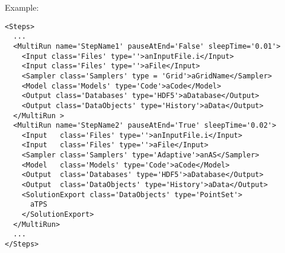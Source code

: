 Example:
\begin{lstlisting}[style=XML,morekeywords={pauseAtEnd,sleepTime,class}]
<Steps>
  ...
  <MultiRun name='StepName1' pauseAtEnd='False' sleepTime='0.01'>
    <Input class='Files' type=''>anInputFile.i</Input>
    <Input class='Files' type=''>aFile</Input>
    <Sampler class='Samplers' type = 'Grid'>aGridName</Sampler>
    <Model class='Models' type='Code'>aCode</Model>
    <Output class='Databases' type='HDF5'>aDatabase</Output>
    <Output class='DataObjects' type='History'>aData</Output>
  </MultiRun >
  <MultiRun name='StepName2' pauseAtEnd='True' sleepTime='0.02'>
    <Input   class='Files' type=''>anInputFile.i</Input>
    <Input   class='Files' type=''>aFile</Input>
    <Sampler class='Samplers' type='Adaptive'>anAS</Sampler>
    <Model   class='Models' type='Code'>aCode</Model>
    <Output  class='Databases' type='HDF5'>aDatabase</Output>
    <Output  class='DataObjects' type='History'>aData</Output>
    <SolutionExport class='DataObjects' type='PointSet'>
      aTPS
    </SolutionExport>
  </MultiRun>
  ...
</Steps>
\end{lstlisting}

